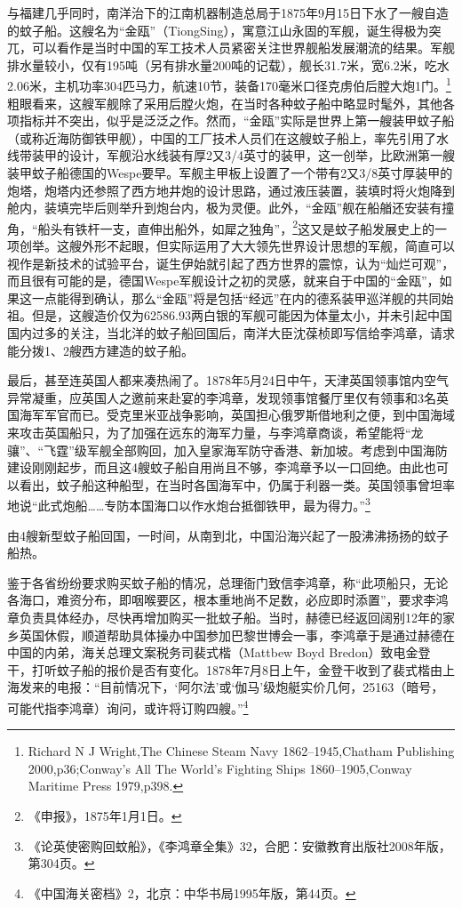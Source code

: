\documentclass[12pt,UTF8]{ctexbook}
\begin{document}
与福建几乎同时，南洋治下的江南机器制造总局于1875年9月15日下水了一艘自造的蚊子船。这艘名为“金瓯”（TiongSing），寓意江山永固的军舰，诞生得极为突兀，可以看作是当时中国的军工技术人员紧密关注世界舰船发展潮流的结果。军舰排水量较小，仅有195吨（另有排水量200吨的记载），舰长31.7米，宽6.2米，吃水2.06米，主机功率304匹马力，航速10节，装备170毫米口径克虏伯后膛大炮1门。\footnote{Richard N J Wright,The Chinese Steam Navy 1862--1945,Chatham Publishing 2000,p36;Conway's All The World's Fighting Ships 1860--1905,Conway Maritime Press 1979,p398.}粗眼看来，这艘军舰除了采用后膛火炮，在当时各种蚊子船中略显时髦外，其他各项指标并不突出，似乎是泛泛之作。然而，“金瓯”实际是世界上第一艘装甲蚊子船（或称近海防御铁甲舰），中国的工厂技术人员们在这艘蚊子船上，率先引用了水线带装甲的设计，军舰沿水线装有厚2又3/4英寸的装甲，这一创举，比欧洲第一艘装甲蚊子船德国的Wespe要早。军舰主甲板上设置了一个带有2又3/8英寸厚装甲的炮塔，炮塔内还参照了西方地井炮的设计思路，通过液压装置，装填时将火炮降到舱内，装填完毕后则举升到炮台内，极为灵便。此外，“金瓯”舰在船艏还安装有撞角，“船头有铁杆一支，直伸出船外，如犀之独角”，\footnote{《申报》，1875年1月1日。}这又是蚊子船发展史上的一项创举。这艘外形不起眼，但实际运用了大大领先世界设计思想的军舰，简直可以视作是新技术的试验平台，诞生伊始就引起了西方世界的震惊，认为“灿烂可观”，而且很有可能的是，德国Wespe军舰设计之初的灵感，就来自于中国的“金瓯”，如果这一点能得到确认，那么“金瓯”将是包括“经远”在内的德系装甲巡洋舰的共同始祖。但是，这艘造价仅为62586.93两白银的军舰可能因为体量太小，并未引起中国国内过多的关注，当北洋的蚊子船回国后，南洋大臣沈葆桢即写信给李鸿章，请求能分拨1、2艘西方建造的蚊子船。

最后，甚至连英国人都来凑热闹了。1878年5月24日中午，天津英国领事馆内空气异常凝重，应英国人之邀前来赴宴的李鸿章，发现领事馆餐厅里仅有领事和3名英国海军军官而已。受克里米亚战争影响，英国担心俄罗斯借地利之便，到中国海域来攻击英国船只，为了加强在远东的海军力量，与李鸿章商谈，希望能将“龙骧”、“飞霆”级军舰全部购回，加入皇家海军防守香港、新加坡。考虑到中国海防建设刚刚起步，而且这4艘蚊子船自用尚且不够，李鸿章予以一口回绝。由此也可以看出，蚊子船这种船型，在当时各国海军中，仍属于利器一类。英国领事曾坦率地说“此式炮船……专防本国海口以作水炮台抵御铁甲，最为得力。”\footnote{《论英使密购回蚊船》，《李鸿章全集》32，合肥：安徽教育出版社2008年版，第304页。}

由4艘新型蚊子船回国，一时间，从南到北，中国沿海兴起了一股沸沸扬扬的蚊子船热。

鉴于各省纷纷要求购买蚊子船的情况，总理衙门致信李鸿章，称“此项船只，无论各海口，难资分布，即咽喉要区，根本重地尚不足数，必应即时添置”，要求李鸿章负责具体经办，尽快再增加购买一批蚊子船。当时，赫德已经返回阔别12年的家乡英国休假，顺道帮助具体操办中国参加巴黎世博会一事，李鸿章于是通过赫德在中国的内弟，海关总理文案税务司裴式楷（Mattbew Boyd Bredon）致电金登干，打听蚊子船的报价是否有变化。1878年7月8日上午，金登干收到了裴式楷由上海发来的电报：“目前情况下，‘阿尔法’或‘伽马’级炮艇实价几何，25163（暗号，可能代指李鸿章）询问，或许将订购四艘。”\footnote{《中国海关密档》2，北京：中华书局1995年版，第44页。}
\end{document}

